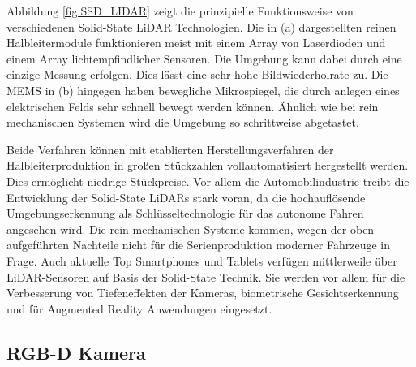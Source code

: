 Abbildung \ref{fig:SSD_LIDAR} zeigt die prinzipielle Funktionsweise von verschiedenen Solid-State LiDAR Technologien. Die in (a) dargestellten reinen Halbleitermodule funktionieren meist mit einem Array von Laserdioden und einem Array lichtempfindlicher Sensoren. Die Umgebung kann dabei durch eine einzige Messung erfolgen. Dies lässt eine sehr hohe Bildwiederholrate zu. Die MEMS in (b) hingegen haben bewegliche Mikrospiegel, die durch anlegen eines elektrischen Felds sehr schnell bewegt werden können. Ähnlich wie bei rein mechanischen Systemen wird die Umgebung so schrittweise abgetastet. 
  
Beide Verfahren können mit etablierten Herstellungsverfahren der Halbleiterproduktion in großen Stückzahlen vollautomatisiert hergestellt werden. Dies ermöglicht niedrige Stückpreise. Vor allem die Automobilindustrie treibt die Entwicklung der Solid-State LiDARs stark voran, da die hochauflösende Umgebungserkennung als Schlüsseltechnologie für das autonome Fahren angesehen wird. Die rein mechanischen Systeme kommen, wegen der oben aufgeführten Nachteile nicht für die Serienproduktion moderner Fahrzeuge in Frage. Auch aktuelle Top Smartphones und Tablets verfügen mittlerweile über LiDAR-Sensoren auf Basis der Solid-State Technik. Sie werden vor allem für die Verbesserung von Tiefeneffekten der Kameras, biometrische Ge\-sichts\-er\-ken\-nung und für Augmented Reality Anwendungen eingesetzt.

%
%


\subsection[RGB-D Kamera (Kopp)]{RGB-D Kamera}

